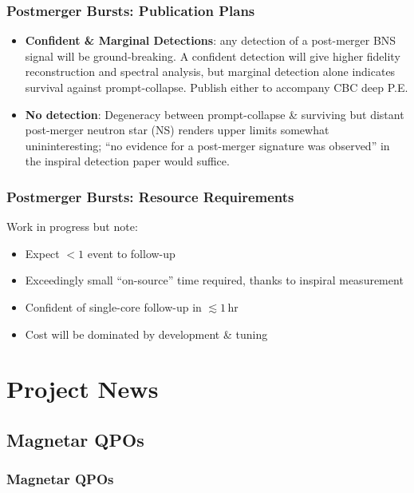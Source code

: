 \documentclass{beamer}
\def\ns#1{neutron star#1 (NS#1)\gdef\ns{NS}}
\begin{document}
\begin{frame}
    \frametitle{Postmerger Bursts: Publication Plans}
    \begin{itemize}
        \item {\bf Confident \& Marginal Detections}: any detection of a
            post-merger BNS signal will be ground-breaking.  A confident
            detection will give higher fidelity reconstruction and spectral
            analysis, but marginal detection alone indicates survival against
            prompt-collapse.  Publish either to accompany CBC deep P.E.
        \item {\bf No detection}: Degeneracy between prompt-collapse \&
            surviving but distant post-merger \ns{} renders upper limits
            somewhat unininteresting; ``no evidence for a post-merger signature
            was observed'' in the inspiral detection paper would suffice.
    \end{itemize}
\end{frame}

\begin{frame}
    \frametitle{Postmerger Bursts: Resource Requirements}
    Work in progress but note:
    \begin{itemize}
        \item Expect $<1$ event to follow-up
        \item Exceedingly small ``on-source'' time required, thanks to inspiral
            measurement
        \item Confident of single-core follow-up in $\lesssim 1$\,hr
        \item Cost will be dominated by development \& tuning
    \end{itemize}
\end{frame}


\section{Project News} 
\begin{frame}\tableofcontents[currentsection]
\end{frame}

\subsection{Magnetar QPOs}
\begin{frame}\frametitle{Magnetar QPOs} 
\end{frame}
\end{document}
